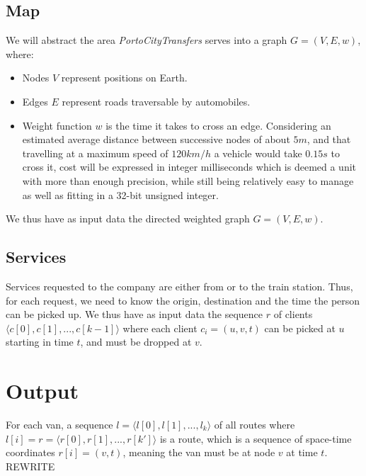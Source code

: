 \documentclass{report}[a4paper]
\theoremstyle{remark}
\begin{document}
\subsection{Map} \label{input-map}
We will abstract the area \emph{PortoCityTransfers} serves into a graph $G=(V,E, w)$, where:
\begin{itemize}
    \item Nodes $V$ represent positions on Earth.
    \item Edges $E$ represent roads traversable by automobiles.
    \item Weight function $w$ is the time it takes to cross an edge. Considering an estimated average distance between successive nodes of about $5 m$, and that travelling at a maximum speed of $120 km/h$ a vehicle would take $0.15 s$ to cross it, cost will be expressed in integer milliseconds which is deemed a unit with more than enough precision, while still being relatively easy to manage as well as fitting in a 32-bit unsigned integer.
\end{itemize}
We thus have as input data the directed weighted graph $G=(V,E,w)$.
\subsection{Services} \label{input-services}
Services requested to the company are either from or to the train station. Thus, for each request, we need to know the origin, destination and the time the person can be picked up.
We thus have as input data the sequence $r$ of clients $\langle c[0], c[1], ..., c[k-1] \rangle$ where each client $c_i=(u, v, t)$ can be picked at $u$ starting in time $t$, and must be dropped at $v$.
\section{Output}
For each van, a sequence $l=\langle l[0], l[1], ..., l_k \rangle$ of all routes where $l[i]=r=\langle r[0], r[1],..., r[k']\rangle$ is a route, which is a sequence of space-time coordinates $r[i]=(v, t)$, meaning the van must be at node $v$ at time $t$. REWRITE
\end{document}
